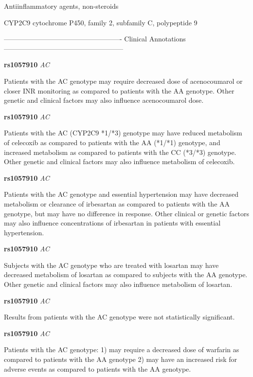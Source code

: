 \documentclass{resume} %
\begin{document}
\begin{rSection}{ Antiinflammatory agents, non-steroids }
\begin{rSubsection}{ CYP2C9 }{ cytochrome P450, family 2, subfamily C, polypeptide 9 }{}{}
\item[]

\item[] ---------------------------------------------------- Clinical Annotations -----------------------------------------------------\newline
\item \textbf{ rs1057910 } \textit{ AC }
\item[] Patients with the AC genotype may require decreased dose of acenocoumarol or closer INR monitoring as compared to patients with the AA genotype. Other genetic and clinical factors may also influence acenocoumarol dose.\item \textbf{ rs1057910 } \textit{ AC }
\item[] Patients with the AC (CYP2C9 *1/*3) genotype may have reduced metabolism of celecoxib as compared to patients with the AA (*1/*1) genotype, and increased metabolism as compared to patients with the CC (*3/*3) genotype. Other genetic and clinical factors may also influence metabolism of celecoxib. \item \textbf{ rs1057910 } \textit{ AC }
\item[] Patients with the AC genotype and essential hypertension may have decreased metabolism or clearance of irbesartan as compared to patients with the AA genotype, but may have no difference in response. Other clinical or genetic factors may also influence concentrations of irbesartan in patients with essential hypertension. \item \textbf{ rs1057910 } \textit{ AC }
\item[] Subjects with the AC genotype who are treated with losartan may have decreased metabolism of losartan as compared to subjects with the AA genotype. Other genetic and clinical factors may also influence metabolism of losartan.\item \textbf{ rs1057910 } \textit{ AC }
\item[] Results from patients with the AC genotype were not statistically significant.\item \textbf{ rs1057910 } \textit{ AC }
\item[] Patients with the AC genotype: 1) may require a decreased dose of warfarin as compared to patients with the AA genotype 2) may have an increased risk for adverse events as compared to patients with the AA genotype.
\end{rSubsection}


\end{rSection}
\end{document}

